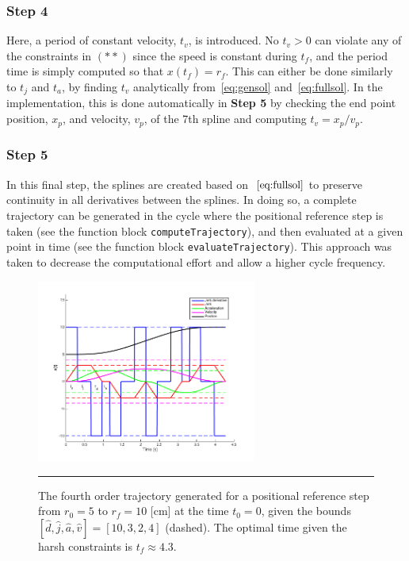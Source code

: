 \documentclass{article}
\begin{document}
\subsubsection*{Step 4}
Here, a period of constant velocity, $t_v$, is introduced. No $t_v>0$ can violate any of the constraints in $(**)$ since the speed is constant during $t_f$, and the period time is simply computed so that  $x(t_f) = r_f$. This can either be done similarly to $t_j$ and $t_a$, by finding $t_v$ analytically from~\eqref{eq:gensol} and~\eqref{eq:fullsol}. In the implementation, this is done automatically in \textbf{Step 5} by checking the end point position, $x_p$, and velocity, $v_p$, of the 7th spline and computing $t_v = x_p/v_p$.

\subsubsection*{Step 5}
In this final step, the splines are created based on $~\eqref{eq:fullsol}$ to preserve continuity in all derivatives between the splines. In doing so, a complete trajectory can be generated in the cycle where the positional reference step is taken (see the function block \texttt{computeTrajectory}), and then evaluated at a given point in time (see the function block \texttt{evaluateTrajectory}). This approach was taken to decrease the computational effort and allow a higher cycle frequency.

\begin{figure}
\centering
\includegraphics[height = 6cm, width = 0.7\linewidth]{figures/Splines.png}
\rule{35em}{0.5pt}
\caption{The fourth order trajectory generated for a positional reference step from $r_0 = 5$ to $r_f=10$ [cm] at the time $t_0 = 0$, given the bounds $[\hat{d},\hat{j},\hat{a},\hat{v}]= [10,3,2,4]$ (dashed). The optimal time given the harsh constraints is $t_f\approx 4.3$.}
\label{fig:posref}
\end{figure}
\end{document}
